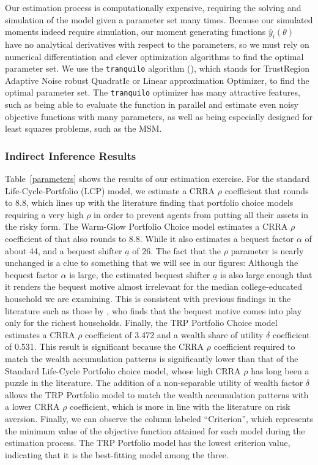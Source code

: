 \documentclass{article}
\newcommand{\CRRA}{\rho}
\begin{document}
Our estimation process is computationally expensive, requiring the solving and simulation of the model given a parameter set many times. Because our simulated moments indeed require simulation, our moment generating functions $\hat{y}_i(\theta)$ have no analytical derivatives with respect to the parameters, so we must rely on numerical differentiation and clever optimization algorithms to find the optimal parameter set. We use the \texttt{tranquilo} algorithm (\cite{Gabler2024}), which stands for TrustRegion Adaptive Noise robust QuadratIc or Linear approximation Optimizer, to find the optimal parameter set. The \texttt{tranquilo} optimizer has many attractive features, such as being able to evaluate the function in parallel and estimate even noisy objective functions with many parameters, as well as being especially designed for least squares problems, such as the MSM.

\subsubsection{Indirect Inference Results}

Table~\ref{parameters} shows the results of our estimation exercise. For the standard Life-Cycle-Portfolio (LCP) model, we estimate a CRRA $\CRRA$ coefficient that rounds to 8.8, which lines up with the literature finding that portfolio choice models requiring a very high $\CRRA$ in order to prevent agents from putting all their assets in the risky form. The Warm-Glow Portfolio Choice model estimates a CRRA $\CRRA$ coefficient of that also rounds to 8.8.  While it also estimates a bequest factor $\alpha$ of about 44, and a bequest shifter $\underline{a}$ of 26. The fact that the $\CRRA$ parameter is nearly unchanged is a clue to something that we will see in our figures:  Although the bequest factor $\alpha$ is large, the estimated bequest shifter $\underline{a}$ is also large enough that it renders the bequest motive almost irrelevant for the median college-educated household we are examining. This is consistent with previous findings in the literature such as those by \cite{deNardiBequest}, who finds that the bequest motive comes into play only for the richest households. Finally, the TRP Portfolio Choice model estimates a CRRA $\CRRA$ coefficient of 3.472 and a wealth share of utility $\delta$ coefficient of 0.531. This result is significant because the CRRA $\CRRA$ coefficient required to match the wealth accumulation patterns is significantly lower than that of the Standard Life-Cycle Portfolio choice model, whose high CRRA $\CRRA$ has long been a puzzle in the literature. The addition of a non-separable utility of wealth factor $\delta$ allows the TRP Portfolio model to match the wealth accumulation patterns with a lower CRRA $\CRRA$ coefficient, which is more in line with the literature on risk aversion. Finally, we can observe the column labeled ``Criterion'', which represents the minimum value of the objective function attained for each model during the estimation process. The TRP Portfolio model has the lowest criterion value, indicating that it is the best-fitting model among the three.
\end{document}
